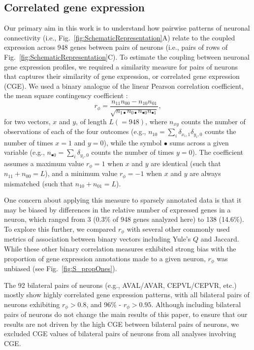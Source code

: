 \documentclass[10pt,letterpaper]{article}
\begin{document}
\subsection*{Correlated gene expression}
Our primary aim in this work is to understand how pairwise patterns of neuronal connectivity (i.e., Fig.~\ref{fig:SchematicRepresentation}A) relate to the coupled expression across 948 genes between pairs of neurons (i.e., pairs of rows of Fig.~\ref{fig:SchematicRepresentation}C).
To estimate the coupling between neuronal gene expression profiles, we required a similarity measure for pairs of neurons that captures their similarity of gene expression, or correlated gene expression (CGE).
We used a binary analogue of the linear Pearson correlation coefficient, the mean square contingency coefficient \cite{Warrens2008}:
\begin{equation} \label{eq:rphi}
    r_\phi = \frac{n_{11}n_{00} - n_{10}n_{01}}{\sqrt{n_{1\bullet}n_{0\bullet}n_{\bullet 0}n_{\bullet 1}}},
\end{equation}
for two vectors, $x$ and $y$, of length $L (=948)$, where $n_{xy}$ counts the number of observations of each of the four outcomes (e.g., $n_{10} = \sum_i \delta_{x_i,1}\delta_{y_i,0}$ counts the number of times $x=1$ and $y=0$), while the symbol $\bullet$ sums across a given variable (e.g., $n_{\bullet 0} = \sum_i \delta_{y_i,0}$ counts the number of times $y = 0$).
The coefficient assumes a maximum value $r_\phi = 1$ when $x$ and $y$ are identical (such that $n_{11} + n_{00} = L$), and a minimum value $r_\phi = -1$ when $x$ and $y$ are always mismatched (such that $n_{10} + n_{01} = L$).

One concern about applying this measure to sparsely annotated data is that it may be biased by differences in the relative number of expressed genes in a neuron, which ranged from 3 (0.3\% of 948 genes analyzed here) to 138 (14.6\%).
To explore this further, we compared $r_\phi$ with several other commonly used metrics of association between binary vectors including Yule's $Q$ and Jaccard.
While these other binary correlation measures exhibited strong bias with the proportion of gene expression annotations made to a given neuron, $r_\phi$ was unbiased (see Fig.~\ref{fig:S_propOnes}).

The 92 bilateral pairs of neurons (e.g., AVAL/AVAR, CEPVL/CEPVR, etc.) mostly show highly correlated gene expression patterns, with all bilateral pairs of neurons exhibiting $r_\phi > 0.8$, and 96\% - $r_\phi > 0.95$.
Although including bilateral pairs of neurons do not change the main results of this paper, to ensure that our results are not driven by the high CGE between bilateral pairs of neurons, we excluded CGE values of bilateral pairs of neurons from all analyses involving CGE.
\end{document}
